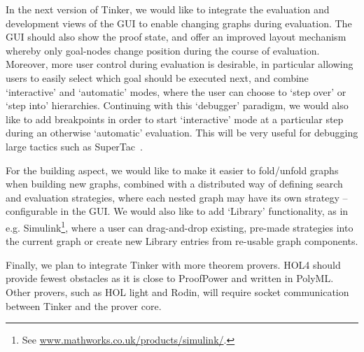 \documentclass[submission,copyright,creativecommons]{eptcs}
\begin{document}
In the next version of Tinker, we would like to integrate the evaluation and development views of the GUI to enable changing graphs during evaluation.
The GUI should also show the proof state, and offer an improved layout mechanism whereby only goal-nodes change position during the course of evaluation. Moreover, more user control during evaluation is desirable, in particular allowing users to easily select which goal should be executed next, and combine `interactive' and `automatic' modes, where the user can choose to `step over' or `step into' hierarchies. Continuing with this `debugger' paradigm, we would also like to add breakpoints in order to start `interactive' mode at a particular step during an otherwise `automatic' evaluation. This will be very useful for debugging large tactics such as SuperTac~\cite{OHalloran13}.

For the building aspect, we would like to make it easier to fold/unfold graphs when building new graphs, combined with a distributed way of defining search and evaluation strategies, where each nested graph may have its own strategy -- configurable in the GUI. We would also like to add `Library' functionality, as in e.g. Simulink\footnote{See \url{www.mathworks.co.uk/products/simulink/}.}, where a user can drag-and-drop existing, pre-made strategies into the current graph or create new Library entries from re-usable graph components.

Finally, we plan to integrate Tinker with more theorem provers. HOL4 should provide fewest obstacles as it is close to ProofPower and written in PolyML. Other provers, such as HOL light and Rodin, will require socket communication between Tinker and the prover core. 



\vspace{-15pt}

\begin{footnotesize}


\end{footnotesize}
\end{document}
